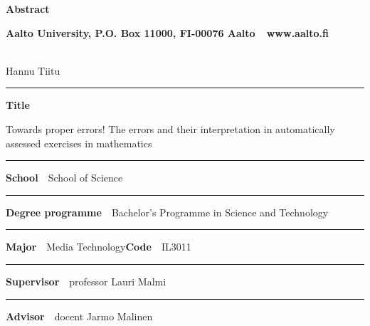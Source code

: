 \begin{spacing}{.88}

{\parindent0pt %

{\fontsize{13.9pt}{13.9pt}\selectfont
\vspace{-8.9mm}\hfill{\bfseries\sffamily\lsstyle Abstract}}

{\fontsize{9.48pt}{9.48pt}\selectfont
\vspace{.9mm}\hfill{\bfseries\sffamily\lsstyle Aalto University, P.O. Box 11000, FI-00076 Aalto~~\textcolor{aaltoGray}{www.aalto.fi}}}

\\
{\small Hannu Tiitu}

\vspace{-2.4mm}\rule{\textwidth}{.75pt}

{\fontsize{10.5pt}{10.5pt}\bfseries\sffamily\lsstyle Title}\\
\parbox[t]{\textwidth}{\raggedright\small Towards proper errors! The errors and their interpretation in automatically assessed exercises in mathematics}

\vspace{.5mm}\rule{\textwidth}{.75pt}

{\fontsize{10.5pt}{10.5pt}\bfseries\sffamily\lsstyle School}~~{\small School of Science}

\vspace{-2.4mm}\rule{\textwidth}{.75pt}

{\fontsize{10.5pt}{10.5pt}\bfseries\sffamily\lsstyle Degree programme}~~{\small Bachelor’s Programme in Science and Technology}

\vspace{-2.4mm}\rule{\textwidth}{.75pt}

{\fontsize{10.5pt}{10.5pt}\bfseries\sffamily\lsstyle Major}~~{\small Media Technology}\hfill{\fontsize{10.5pt}{10.5pt}\bfseries\sffamily\lsstyle Code}~~{\small IL3011}

\vspace{-2.4mm}\rule{\textwidth}{.75pt}

{\fontsize{10.5pt}{10.5pt}\bfseries\sffamily\lsstyle Supervisor}~~{\small professor Lauri Malmi}

\vspace{-2.4mm}\rule{\textwidth}{.75pt}

{\fontsize{10.5pt}{10.5pt}\bfseries\sffamily\lsstyle Advisor}~~{\small docent Jarmo Malinen}

}
\end{spacing}
